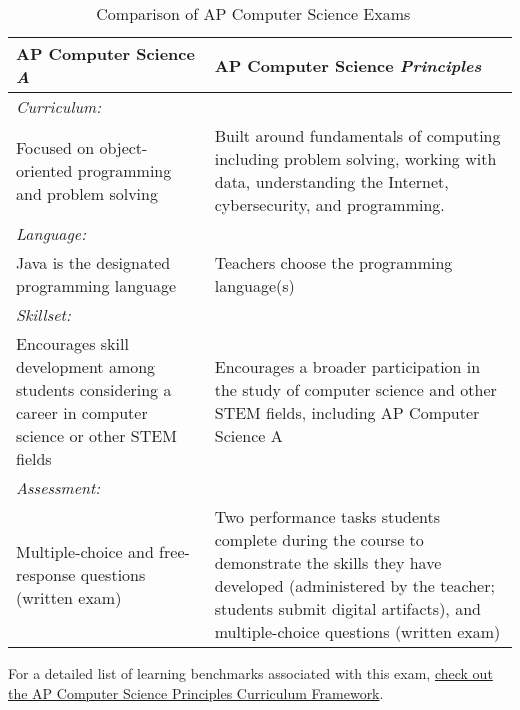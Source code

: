 \begin{table}
	\centering
	\bgroup
	\def\arraystretch{1.5}
	\begin{tabular}{ p{7cm} p{7cm} }
		\hline
		\textbf{AP Computer Science \textit{A}} &	\textbf{AP Computer Science \textit{Principles}} \\ \hline \hline
		\multicolumn{2}{l}{\textit{Curriculum:}} \\
		Focused on object-oriented programming and problem solving & Built around fundamentals of computing including problem solving, working with data, understanding the Internet, cybersecurity, and programming. \\ \hline
		\multicolumn{2}{l}{\textit{Language:}} \\
		Java is the designated programming language	& Teachers choose the programming language(s) \\ \hline
		\multicolumn{2}{l}{\textit{Skillset:}} \\
		Encourages skill development among students considering a career in computer science or other STEM fields & Encourages a broader participation in the study of computer science and other STEM fields, including AP Computer Science A \\ \hline
		\multicolumn{2}{l}{\textit{Assessment:}} \\
		Multiple-choice and free-response questions (written exam) & Two performance tasks students complete during the course to demonstrate the skills they have developed (administered by the teacher; students submit digital artifacts), and multiple-choice questions (written exam) \\ \hline
	\end{tabular}
	\egroup 
	\caption{Comparison of AP Computer Science Exams ~\cite{APcomp}} \label{tab:apexams} 
\end{table}\par
For a detailed list of learning benchmarks associated with this exam, \href{https://secure-media.collegeboard.org/digitalServices/pdf/ap/ap-computer-science-principles-curriculum-framework.pdf}{check out the AP Computer Science Principles Curriculum Framework}. \par

